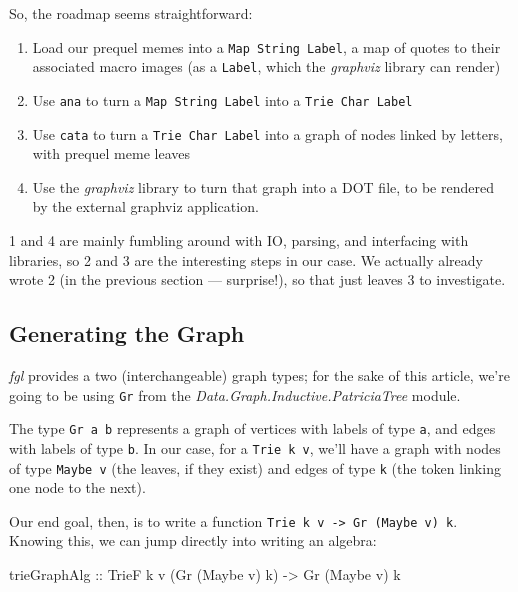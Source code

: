 \documentclass[]{article}
\newenvironment{Shaded}{}{}
\newcommand{\DataTypeTok}[1]{\textcolor[rgb]{0.56,0.13,0.00}{#1}}
\newcommand{\NormalTok}[1]{#1}
\newcommand{\OtherTok}[1]{\textcolor[rgb]{0.00,0.44,0.13}{#1}}
\begin{document}
So, the roadmap seems straightforward:

\begin{enumerate}
\def\labelenumi{\arabic{enumi}.}
\tightlist
\item
  Load our prequel memes into a \texttt{Map\ String\ Label}, a map of quotes to
  their associated macro images (as a \texttt{Label}, which the \emph{graphviz}
  library can render)
\item
  Use \texttt{ana} to turn a \texttt{Map\ String\ Label} into a
  \texttt{Trie\ Char\ Label}
\item
  Use \texttt{cata} to turn a \texttt{Trie\ Char\ Label} into a graph of nodes
  linked by letters, with prequel meme leaves
\item
  Use the \emph{graphviz} library to turn that graph into a DOT file, to be
  rendered by the external graphviz application.
\end{enumerate}

1 and 4 are mainly fumbling around with IO, parsing, and interfacing with
libraries, so 2 and 3 are the interesting steps in our case. We actually already
wrote 2 (in the previous section --- surprise!), so that just leaves 3 to
investigate.

\hypertarget{generating-the-graph}{%
\subsection{Generating the Graph}\label{generating-the-graph}}

\emph{fgl} provides a two (interchangeable) graph types; for the sake of this
article, we're going to be using \texttt{Gr} from the
\emph{Data.Graph.Inductive.PatriciaTree} module.

The type \texttt{Gr\ a\ b} represents a graph of vertices with labels of type
\texttt{a}, and edges with labels of type \texttt{b}. In our case, for a
\texttt{Trie\ k\ v}, we'll have a graph with nodes of type \texttt{Maybe\ v}
(the leaves, if they exist) and edges of type \texttt{k} (the token linking one
node to the next).

Our end goal, then, is to write a function
\texttt{Trie\ k\ v\ -\textgreater{}\ Gr\ (Maybe\ v)\ k}. Knowing this, we can
jump directly into writing an algebra:

\begin{Shaded}
\begin{Highlighting}[]
\NormalTok{trieGraphAlg}
\OtherTok{    ::} \DataTypeTok{TrieF}\NormalTok{ k v (}\DataTypeTok{Gr}\NormalTok{ (}\DataTypeTok{Maybe}\NormalTok{ v) k)}
    \OtherTok{->} \DataTypeTok{Gr}\NormalTok{ (}\DataTypeTok{Maybe}\NormalTok{ v) k}
\end{Highlighting}
\end{Shaded}
\end{document}
